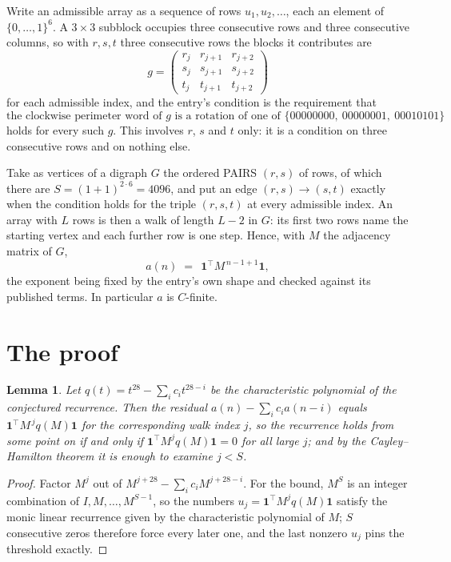 \documentclass[11pt,a4paper]{article}
\theoremstyle{plain}
\newtheorem{lemma}[theorem]{Lemma}
\theoremstyle{definition}
\begin{document}
Write an admissible array as a sequence of rows $u_1,u_2,\dots$, each an element of
$\{0,\dots,1\}^{6}$. A $3\times3$ subblock occupies three consecutive rows and
three consecutive columns, so with $r,s,t$ three consecutive rows the blocks it
contributes are
\[
g=\begin{pmatrix}r_j&r_{j+1}&r_{j+2}\\ s_j&s_{j+1}&s_{j+2}\\ t_j&t_{j+1}&t_{j+2}\end{pmatrix}
\]
for each admissible index, and the entry's condition is the requirement that
\[
\text{the clockwise perimeter word of }g\text{ is a rotation of one of }\{00000000,\ 00000001,\ 00010101\}
\]
holds for every such $g$. This involves $r$, $s$ and $t$ only: it is a condition on
three consecutive rows and on nothing else.

Take as vertices of a digraph $G$ the ordered PAIRS $(r,s)$ of rows, of which there are
$S=(1+1)^{2\cdot6}=4096$, and put an edge $(r,s)\to(s,t)$ exactly when the condition
holds for the triple $(r,s,t)$ at every admissible index. An array with $L$ rows is then a
walk of length $L-2$ in $G$: its first two rows name the starting vertex and each further
row is one step. Hence, with $M$ the adjacency matrix of $G$,
\[
a(n)\;=\;\,\mathbf{1}^{\!\top}M^{\,n-1+1}\mathbf{1},
\]
the exponent being fixed by the entry's own shape and checked against its published terms.
In particular $a$ is $C$-finite.

\section{The proof}

\begin{lemma}\label{lem:crit}
Let $q(t)=t^{28}-\sum_i c_it^{28-i}$ be the characteristic polynomial of the
conjectured recurrence. Then the residual $a(n)-\sum_ic_ia(n-i)$ equals
$\mathbf{1}^{\!\top}M^{\,j}q(M)\mathbf{1}$ for the corresponding walk index
$j$, so the recurrence holds from some point on if and only if
$\mathbf{1}^{\!\top}M^{j}q(M)\mathbf{1}=0$ for all large $j$; and by the
Cayley--Hamilton theorem it is enough to examine $j<S$.
\end{lemma}

\begin{proof}
Factor $M^{j}$ out of $M^{j+28}-\sum_ic_iM^{j+28-i}$. For the bound, $M^{S}$
is an integer combination of $I,M,\dots,M^{S-1}$, so the numbers
$u_j=\mathbf{1}^{\!\top}M^{j}q(M)\mathbf{1}$ satisfy the monic linear recurrence given by
the characteristic polynomial of $M$; $S$ consecutive zeros therefore force every later one,
and the last nonzero $u_j$ pins the threshold exactly.
\end{proof}
\end{document}
